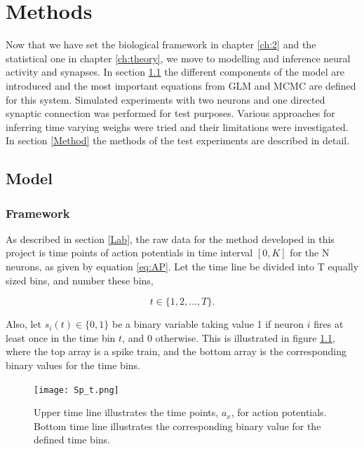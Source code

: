 
\chapter{Methods}
\label{ch:methods}

Now that we have set the biological framework in chapter \ref{ch:2} and the statistical one in chapter \ref{ch:theory}, we move to modelling and inference neural activity and synapses. In section \ref{set_up} the different components of the model are introduced and the most important equations from GLM and MCMC are defined for this system. Simulated experiments with two neurons and one directed synaptic connection was performed for test purposes. Various approaches for inferring time varying weighs were tried and their limitations were investigated. In section \ref{Method} the methods of the test experiments are described in detail.

\section{Model}
\label{set_up}

\subsection{Framework}
As described in section \ref{Lab}, the raw data for the method developed in this project is time points of action potentials in time interval $[0,K]$ for the N neurons, as given by equation \ref{eq:AP}. Let the time line be divided into T equally sized bins, and number these bins,

\begin{equation}
    t \in \{1, 2, ..., T\}.
\end{equation}

Also, let $s_{i}(t) \in \{0,1\}$ be a binary variable taking value 1 if neuron $i$ fires at least once in the time bin $t$, and 0 otherwise. This is illustrated in figure \ref{fig:spike_train}, where the top array is a spike train, and the bottom array is the corresponding binary values for the time bins.

\begin{figure}[h]
\caption{Upper time line illustrates the time points, $a_x$, for action potentials. Bottom time line illustrates the corresponding binary value for the defined time bins.}
\label{fig:spike_train}
    \centering
    \texttt{[image: Sp\_t.png]}
\end{figure} 

